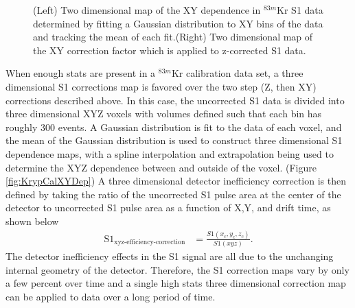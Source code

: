 \documentclass[a4paper,12pt]{article}
\begin{document}
{%
\begin{figure} 
\centering
{}
\qquad
{}
\caption{ (Left) Two dimensional map of the XY dependence in $^{83m}$Kr S1 data determined by fitting a Gaussian distribution to XY bins of the data and tracking the mean of each fit.(Right) Two dimensional map of the XY correction factor which is applied to z-corrected S1 data.}
\label{fig:KrypCalS1XYDep}
\end{figure}


When enough stats are present in a $^{83m}$Kr calibration data set, a three dimensional S1 corrections map is favored over the two step (Z, then XY) corrections described above.  In this case, the uncorrected S1 data is divided into three dimensional XYZ voxels with volumes defined such that each bin has roughly 300 events. A Gaussian distribution is fit to the data of each voxel, and the mean of the Gaussian distribution is used to construct three dimensional S1 dependence maps, with a spline interpolation and extrapolation being used to determine the XYZ dependence between and outside of the voxel. (Figure \ref{fig:KrypCalXYDep}) A three dimensional detector inefficiency correction is then defined by taking the ratio of the uncorrected S1 pulse area at the center of the detector to uncorrected S1 pulse area as a function of X,Y, and drift time, as shown below
\begin{align}
\mbox{S}1_{\mbox{xyz-efficiency-correction}} &= \frac{S1(x_c,y_c,z_c)}{S1(xyz)}.
\end{align} 
The detector inefficiency effects in the S1 signal are all due to the unchanging internal geometry of the detector.  Therefore, the S1 correction maps vary by only a few percent over time and a single high stats three dimensional correction map can be applied to data over a long period of time.  

}
\end{document}
